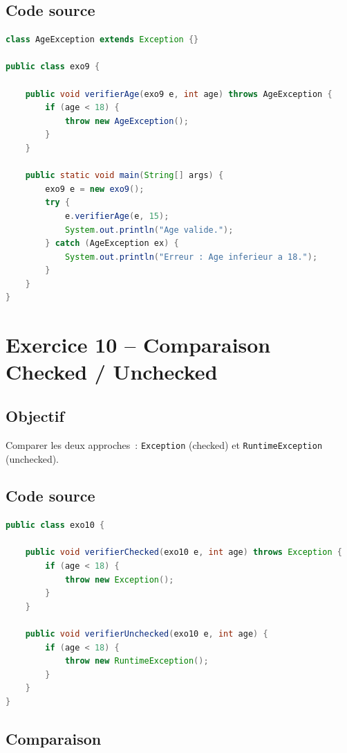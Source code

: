 \subsection{Code source}

\begin{lstlisting}[language=Java, caption={exo9.java -- AgeException personnalisée}]
class AgeException extends Exception {}

public class exo9 {

    public void verifierAge(exo9 e, int age) throws AgeException {
        if (age < 18) {
            throw new AgeException();
        }
    }

    public static void main(String[] args) {
        exo9 e = new exo9();
        try {
            e.verifierAge(e, 15);
            System.out.println("Age valide.");
        } catch (AgeException ex) {
            System.out.println("Erreur : Age inferieur a 18.");
        }
    }
}
\end{lstlisting}

\section{Exercice 10 -- Comparaison Checked / Unchecked}

\subsection{Objectif}

Comparer les deux approches~: \texttt{Exception} (checked) et \texttt{RuntimeException} (unchecked).

\subsection{Code source}

\begin{lstlisting}[language=Java, caption={exo10.java -- Comparaison Checked vs Unchecked}]
public class exo10 {

    public void verifierChecked(exo10 e, int age) throws Exception {
        if (age < 18) {
            throw new Exception();
        }
    }

    public void verifierUnchecked(exo10 e, int age) {
        if (age < 18) {
            throw new RuntimeException();
        }
    }
}
\end{lstlisting}

\subsection{Comparaison}

